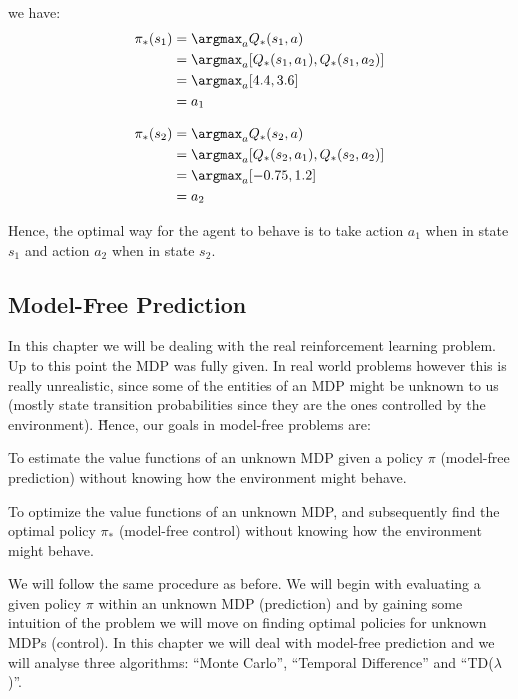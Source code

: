 we have:
\begin{align*}
\pi_*(s_1) &= \argmax_{a} Q_*(s_1,a) \\
&= \argmax_{a} [Q_*(s_1,a_1), Q_*(s_1,a_2)] \\
&= \argmax_{a} [4.4, 3.6] \\
&= a_1
\end{align*}

\vspace{-15pt}

\begin{align*}
\pi_*(s_2) &= \argmax_{a} Q_*(s_2,a) \\
&= \argmax_{a} [Q_*(s_2,a_1), Q_*(s_2,a_2)] \\
&= \argmax_{a} [-0.75, 1.2] \\
&= a_2
\end{align*}

Hence, the optimal way for the agent to behave is to take action $a_1$ when in state $s_1$ and action $a_2$ when in
state $s_2$.

\subsection{Model-Free Prediction}

In this chapter we will be dealing with the real reinforcement learning problem. Up to this point the MDP was fully
given. In real world problems however this is really unrealistic, since some of the entities of an MDP might be
unknown to us (mostly state transition probabilities since they are the ones controlled by the environment). \v

Hence, our goals in model-free problems are:
\bit
\item To estimate the value functions of an unknown MDP given a policy $\pi$ (model-free prediction) without knowing
how the environment might behave.
\item To optimize the value functions of an unknown MDP, and subsequently find the optimal policy $\pi_*$ (model-free
control) without knowing how the environment might behave.
\eit

We will follow the same procedure as before. We will begin with evaluating a given policy $\pi$ within an unknown MDP
(prediction) and by gaining some intuition of the problem we will move on finding optimal policies for unknown MDPs
(control). In this chapter we will deal with model-free prediction and we will analyse three algorithms: ``Monte
Carlo'', ``Temporal Difference'' and ``TD($\lambda$)''.

